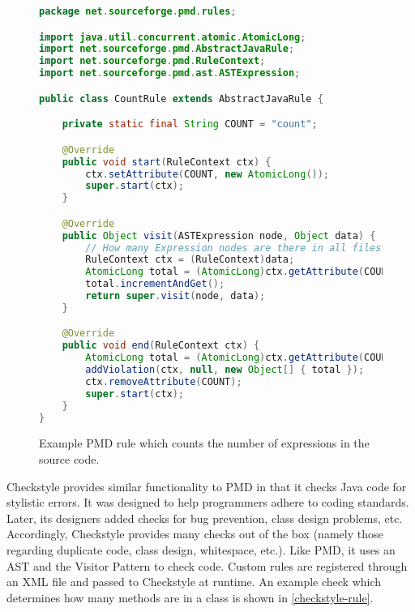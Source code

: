\documentclass[12pt]{report}
\begin{document}
\begin{figure}
\begin{lstlisting}[language=Java]
package net.sourceforge.pmd.rules;

import java.util.concurrent.atomic.AtomicLong;
import net.sourceforge.pmd.AbstractJavaRule;
import net.sourceforge.pmd.RuleContext;
import net.sourceforge.pmd.ast.ASTExpression;

public class CountRule extends AbstractJavaRule {

	private static final String COUNT = "count";

	@Override
	public void start(RuleContext ctx) {
		ctx.setAttribute(COUNT, new AtomicLong());
		super.start(ctx);
	}

	@Override
	public Object visit(ASTExpression node, Object data) {
		// How many Expression nodes are there in all files parsed! 
		RuleContext ctx = (RuleContext)data;
		AtomicLong total = (AtomicLong)ctx.getAttribute(COUNT);
		total.incrementAndGet();
		return super.visit(node, data);
	}

	@Override
	public void end(RuleContext ctx) {
		AtomicLong total = (AtomicLong)ctx.getAttribute(COUNT);
		addViolation(ctx, null, new Object[] { total });
		ctx.removeAttribute(COUNT);
		super.start(ctx);
	}
}
\end{lstlisting}
\caption[Example PMD Rule]{Example PMD rule which counts the number of expressions in the source code.}
\label{pmd-rule}
\end{figure}

Checkstyle provides similar functionality to PMD in that it checks Java code for stylistic errors.  It was 
designed to help programmers adhere to coding standards. Later, its designers added checks for bug 
prevention, class design problems, etc. Accordingly, Checkstyle provides many checks out of the box 
(namely those regarding duplicate code, class design, whitespace, etc.). Like PMD, it uses an AST and 
the Visitor Pattern to check code. Custom rules are registered through an XML file and passed to 
Checkstyle at runtime. An example check which determines how many methods are in a class is shown 
in \autoref{checkstyle-rule}.
\end{document}
